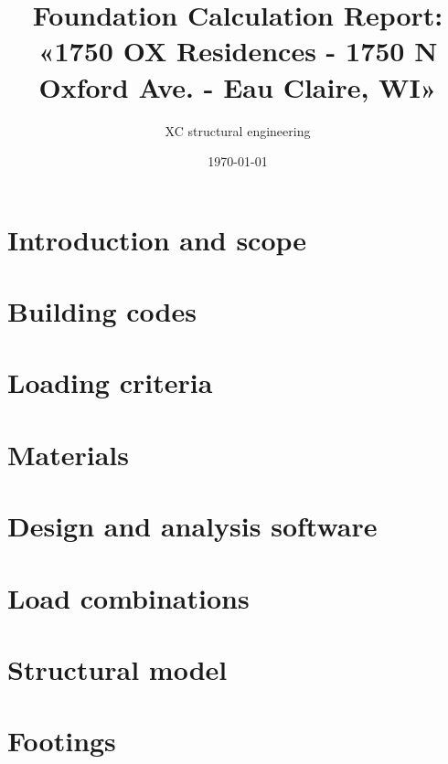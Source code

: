 

\usepackage{array, boldline, makecell, booktabs}
\newcommand\btrule[1]{\specialrule{#1}{0pt}{0pt}}
\usepackage{colortbl}
\usepackage{multicol,caption}               %
\usepackage{xcolor}
\usepackage{hyperref}
\newenvironment{Figure}
  {\par\medskip\noindent\minipage{\linewidth}}
  {\endminipage\par\medskip}
\usepackage{caption}
\usepackage[section]{placeins}

\title{Foundation Calculation Report: «1750 OX Residences - 1750 N Oxford Ave. - Eau Claire, WI» }
\author{XC structural engineering}
\date{\today}
\newcommand{\revision}{0.0}
\newcommand{\titdocum}{Foundation Calculation Report}

\maketitle
\tableofcontents
\listoftables
\listoffigures
\section{Introduction and scope}

\section{Building codes}

\section{Loading criteria}

\section{Materials}

\section{Design and analysis software}

\section{Load combinations}

\section{Structural model}

\section{Footings}

